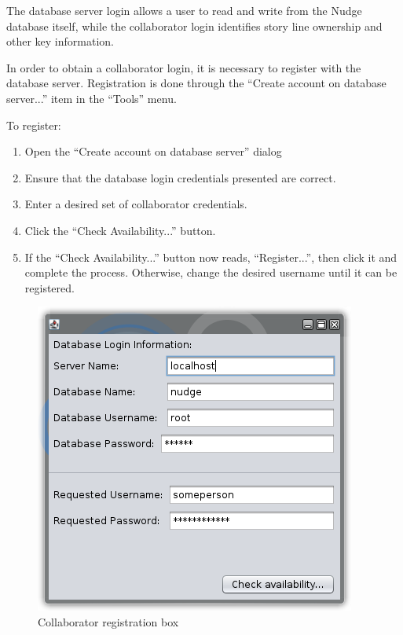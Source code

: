 \documentclass[12pt,letterpaper]{article}
\begin{document}
The database server login allows a user to read and write from the Nudge database itself, while the collaborator login identifies story line ownership and other key information.

In order to obtain a collaborator login, it is necessary to register with the database server. Registration is done
through the ``Create account on database server...'' item in the ``Tools'' menu. 

To register:
    
\begin{enumerate}
\item Open the ``Create account on database server'' dialog
\item Ensure that the database login credentials presented are correct.
\item Enter a desired set of collaborator credentials.
\item Click the ``Check Availability...'' button.
\item If the ``Check Availability...'' button now reads, ``Register...'', then click it and complete the process. Otherwise, change the desired username until it can be registered.
\end{enumerate}

\begin{figure}
    \begin{center}
        \includegraphics[scale=1]{registrationwindow.png}
    \end{center}
    \caption{Collaborator registration box}
\end{figure}
\end{document}
